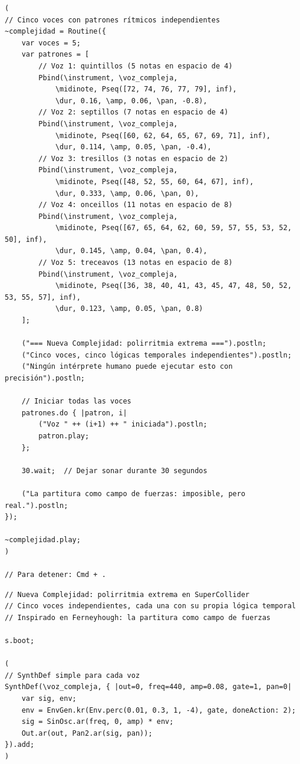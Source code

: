 \documentclass[14pt, a4paper]{article}
\begin{document}
\begin{enumerate}
\begin{verbatim}
(
// Cinco voces con patrones rítmicos independientes
~complejidad = Routine({
    var voces = 5;
    var patrones = [
        // Voz 1: quintillos (5 notas en espacio de 4)
        Pbind(\instrument, \voz_compleja,
            \midinote, Pseq([72, 74, 76, 77, 79], inf),
            \dur, 0.16, \amp, 0.06, \pan, -0.8),
        // Voz 2: septillos (7 notas en espacio de 4)
        Pbind(\instrument, \voz_compleja,
            \midinote, Pseq([60, 62, 64, 65, 67, 69, 71], inf),
            \dur, 0.114, \amp, 0.05, \pan, -0.4),
        // Voz 3: tresillos (3 notas en espacio de 2)
        Pbind(\instrument, \voz_compleja,
            \midinote, Pseq([48, 52, 55, 60, 64, 67], inf),
            \dur, 0.333, \amp, 0.06, \pan, 0),
        // Voz 4: onceillos (11 notas en espacio de 8)
        Pbind(\instrument, \voz_compleja,
            \midinote, Pseq([67, 65, 64, 62, 60, 59, 57, 55, 53, 52, 50], inf),
            \dur, 0.145, \amp, 0.04, \pan, 0.4),
        // Voz 5: treceavos (13 notas en espacio de 8)
        Pbind(\instrument, \voz_compleja,
            \midinote, Pseq([36, 38, 40, 41, 43, 45, 47, 48, 50, 52, 53, 55, 57], inf),
            \dur, 0.123, \amp, 0.05, \pan, 0.8)
    ];

    ("=== Nueva Complejidad: polirritmia extrema ===").postln;
    ("Cinco voces, cinco lógicas temporales independientes").postln;
    ("Ningún intérprete humano puede ejecutar esto con precisión").postln;

    // Iniciar todas las voces
    patrones.do { |patron, i|
        ("Voz " ++ (i+1) ++ " iniciada").postln;
        patron.play;
    };

    30.wait;  // Dejar sonar durante 30 segundos

    ("La partitura como campo de fuerzas: imposible, pero real.").postln;
});

~complejidad.play;
)

// Para detener: Cmd + .
\end{verbatim}

\begin{verbatim}
// Nueva Complejidad: polirritmia extrema en SuperCollider
// Cinco voces independientes, cada una con su propia lógica temporal
// Inspirado en Ferneyhough: la partitura como campo de fuerzas

s.boot;

(
// SynthDef simple para cada voz
SynthDef(\voz_compleja, { |out=0, freq=440, amp=0.08, gate=1, pan=0|
    var sig, env;
    env = EnvGen.kr(Env.perc(0.01, 0.3, 1, -4), gate, doneAction: 2);
    sig = SinOsc.ar(freq, 0, amp) * env;
    Out.ar(out, Pan2.ar(sig, pan));
}).add;
)


\end{verbatim}
\end{enumerate}
\end{document}

